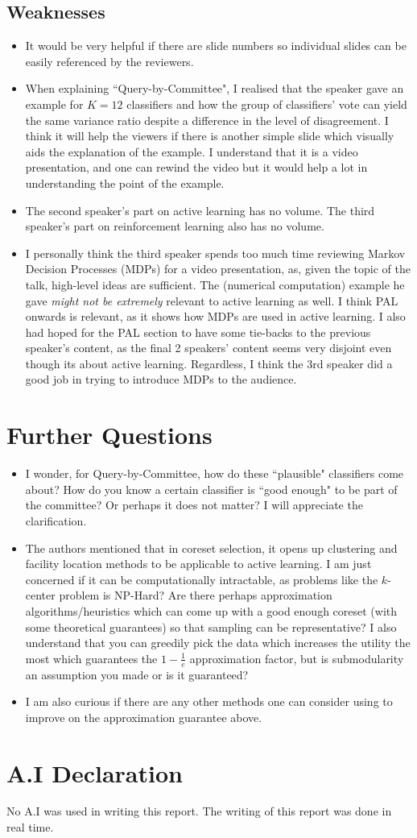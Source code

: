 \documentclass{article}
\begin{document}
\subsection{Weaknesses}
\begin{itemize}
    \item It would be very helpful if there are slide numbers so individual slides can be easily referenced by the reviewers.
    \item When explaining ``Query-by-Committee", I realised that the speaker gave an example for $K = 12$ classifiers and how the group of classifiers' vote can yield the same variance ratio despite a difference in the level of disagreement. I think it will help the viewers if there is another simple slide which visually aids the explanation of the example. I understand that it is a video presentation, and one can rewind the video but it would help a lot in understanding the point of the example.
    \item The second speaker's part on active learning has no volume. The third speaker's part on reinforcement learning also has no volume.
    \item I personally think the third speaker spends too much time reviewing Markov Decision Processes (MDPs) for a video presentation, as, given the topic of the talk, high-level ideas are sufficient. The (numerical computation) example he gave \textit{might not be extremely} relevant to active learning as well. I think PAL onwards is relevant, as it shows how MDPs are used in active learning. I also had hoped for the PAL section to have some tie-backs to the previous speaker's content, as the final 2 speakers' content seems very disjoint even though its about active learning. Regardless, I think the 3rd speaker did a good job in trying to introduce MDPs to the audience.
\end{itemize}
\section{Further Questions}
\begin{itemize}
    \item I wonder, for Query-by-Committee, how do these ``plausible" classifiers come about? How do you know a certain classifier is ``good enough" to be part of the committee? Or perhaps it does not matter? I will appreciate the clarification.
    \item The authors mentioned that in coreset selection, it opens up clustering and facility location methods to be applicable to active learning. I am just concerned if it can be computationally intractable, as problems like the $k$-center problem is NP-Hard? Are there perhaps approximation algorithms/heuristics which can come up with a good enough coreset (with some theoretical guarantees) so that sampling can be representative? I also understand that you can greedily pick the data which increases the utility the most which guarantees the $1 - \frac{1}{e}$ approximation factor, but is submodularity an assumption you made or is it guaranteed?
    \item I am also curious if there are any other methods one can consider using to improve on the approximation guarantee above.
\end{itemize}

\section*{A.I Declaration}
No A.I was used in writing this report. The writing of this report was done in real time.
\end{document}
